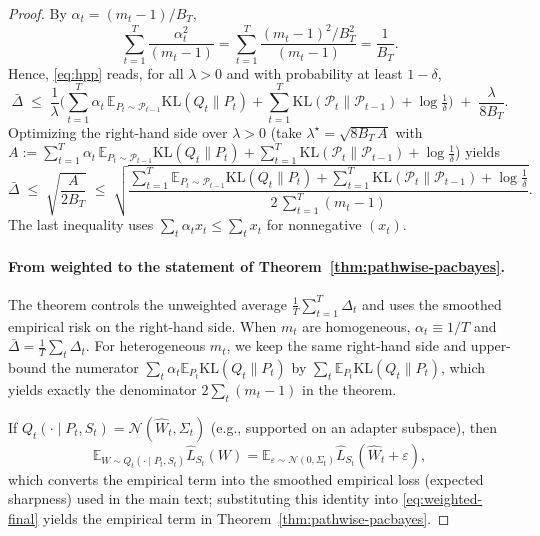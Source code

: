 \documentclass{article} %
\begin{document}
\begin{proof}

By $\alpha_t=(m_t-1)/B_T$,
\[
\sum_{t=1}^T \frac{\alpha_t^2}{(m_t-1)}
=\sum_{t=1}^T \frac{(m_t-1)^2/B_T^2}{(m_t-1)}
=\frac{1}{B_T}.
\]
Hence, \eqref{eq:hpp} reads, for all $\lambda>0$ and with probability at least $1-\delta$,
\begin{equation}
\label{eq:gap-preopt}
\bar\Delta
\;\le\;
\frac{1}{\lambda}\Big(
\sum_{t=1}^T \alpha_t\,\mathbb E_{P_t\sim\mathcal P_{t-1}}\mathrm{KL}(Q_t\|P_t)
+ \sum_{t=1}^T \mathrm{KL}(\mathcal P_t\|\mathcal P_{t-1})
+ \log\tfrac1\delta\Big)
\;+\;
\frac{\lambda}{8B_T}.
\end{equation}
Optimizing the right-hand side over $\lambda>0$ (take $\lambda^\star=\sqrt{8B_T\,A}$ with
$A:=\sum_{t=1}^T \alpha_t\,\mathbb E_{P_t\sim\mathcal P_{t-1}}\mathrm{KL}(Q_t\|P_t)
+ \sum_{t=1}^T \mathrm{KL}(\mathcal P_t\|\mathcal P_{t-1}) + \log\tfrac1\delta$) yields
\begin{equation}
\label{eq:weighted-final}
\bar\Delta
\;\le\;
\sqrt{\frac{A}{2B_T}}
\;\le\;
\sqrt{\frac{
\sum_{t=1}^T \mathbb E_{P_t\sim\mathcal P_{t-1}}\mathrm{KL}(Q_t\|P_t)
+ \sum_{t=1}^T \mathrm{KL}(\mathcal P_t\|\mathcal P_{t-1})
+ \log\tfrac1\delta}{2\,\sum_{t=1}^T (m_t-1)}}.
\end{equation}
The last inequality uses $\sum_t \alpha_t x_t \le \sum_t x_t$ for nonnegative $(x_t)$.

\paragraph{From weighted to the statement of Theorem~\ref{thm:pathwise-pacbayes}.}
The theorem controls the unweighted average $\frac1T\sum_{t=1}^T \Delta_t$ and uses the smoothed empirical risk on the right-hand side.
When $m_t$ are homogeneous, $\alpha_t\equiv 1/T$ and $\bar\Delta=\frac1T\sum_t\Delta_t$.
For heterogeneous $m_t$, we keep the same right-hand side and upper-bound the numerator $\sum_t \alpha_t \mathbb E_{P_t}\mathrm{KL}(Q_t\|P_t)$ by $\sum_t \mathbb E_{P_t}\mathrm{KL}(Q_t\|P_t)$, which yields exactly the denominator $2\sum_t(m_t-1)$ in the theorem.


If $Q_t(\cdot\mid P_t,S_t)=\mathcal N(\hat W_t,\Sigma_t)$ (e.g., supported on an adapter subspace), then
\[
\mathbb E_{W\sim Q_t(\cdot\mid P_t,S_t)}\hat L_{S_t}(W)
=\mathbb E_{\varepsilon\sim\mathcal N(0,\Sigma_t)}\hat L_{S_t}(\hat W_t+\varepsilon),
\]
which converts the empirical term into the smoothed empirical loss (expected sharpness) used in the main text; substituting this identity into \eqref{eq:weighted-final} yields the empirical term in Theorem~\ref{thm:pathwise-pacbayes}.

\end{proof}
\end{document}
